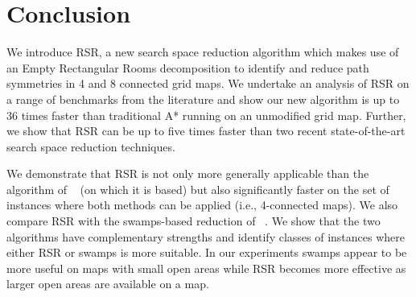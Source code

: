 \section{Conclusion}
We introduce RSR, a new search space reduction algorithm
which makes use of an Empty Rectangular Rooms decomposition
to identify and reduce path symmetries in 4 and 8 connected
grid maps.
We undertake an analysis of RSR on a range of benchmarks from the
literature and show our new algorithm is up to 36 times faster than
traditional A* running on an unmodified grid map.
Further, we show that RSR can be up to five times faster than two recent
state-of-the-art search space reduction techniques.
\par
We demonstrate that RSR is not only more generally applicable
than the algorithm of \citeauthor{harabor10}~ 
(on which it is based) but also significantly faster on the set of 
instances where both methods can be applied (i.e., 4-connected maps).
We also compare RSR with the swamps-based reduction
of \citeauthor{pochter10}~.
We show that the two algorithms have complementary strengths and identify 
classes of instances where either RSR or swamps is more suitable.
In our experiments swamps appear to be more useful on maps with small open areas
while RSR becomes more effective as larger open areas are available on a map.
\par



